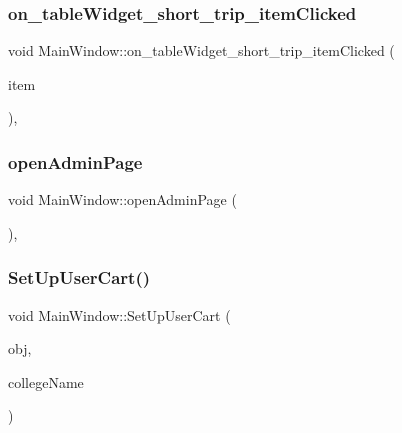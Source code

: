\subsubsection{\texorpdfstring{on\+\_\+table\+Widget\+\_\+short\+\_\+trip\+\_\+item\+Clicked}{on\_tableWidget\_short\_trip\_itemClicked}}
{\footnotesize\ttfamily void Main\+Window\+::on\+\_\+table\+Widget\+\_\+short\+\_\+trip\+\_\+item\+Clicked (\begin{DoxyParamCaption}\item[{Q\+Table\+Widget\+Item $\ast$}]{item }\end{DoxyParamCaption})\hspace{0.3cm}{\ttfamily [private]}, {\ttfamily [slot]}}

\mbox{\label{class_main_window_ad6870a362f2b9f26be145aa3b6a3998a}} 
\subsubsection{\texorpdfstring{open\+Admin\+Page}{openAdminPage}}
{\footnotesize\ttfamily void Main\+Window\+::open\+Admin\+Page (\begin{DoxyParamCaption}{ }\end{DoxyParamCaption})\hspace{0.3cm}{\ttfamily [private]}, {\ttfamily [slot]}}

\mbox{\label{class_main_window_af2cf9ae1dfdb33e7e5239f577d6a4420}} 
\subsubsection{\texorpdfstring{Set\+Up\+User\+Cart()}{SetUpUserCart()}\hspace{0.1cm}{\footnotesize\ttfamily [1/2]}}
{\footnotesize\ttfamily void Main\+Window\+::\+Set\+Up\+User\+Cart (\begin{DoxyParamCaption}\item[{\hyperlink{class_trip}{Trip} \&}]{obj,  }\item[{Q\+String}]{college\+Name }\end{DoxyParamCaption})}

